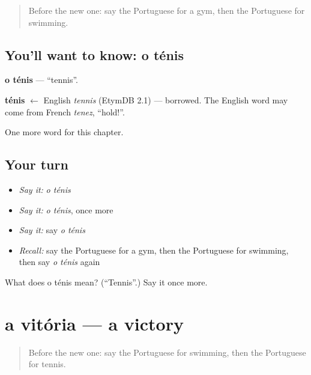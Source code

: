 \label{lesson:PT-C226-tenis}



\begin{quote}
Before the new one: say the Portuguese for a gym, then the Portuguese for swimming.
\end{quote}

\subsection*{You'll want to know: o ténis}
\textbf{o ténis} — \textquotedblleft{}tennis\textquotedblright{}.

\begin{cousinweb}
\textbf{ténis} $\leftarrow$ English \emph{tennis} (EtymDB 2.1) — borrowed. The English word may come from French \emph{tenez}, \textquotedblleft{}hold!\textquotedblright{}.
\end{cousinweb}

\begin{grammarlens}[title={What you've built}]
One more word for this chapter.
\end{grammarlens}

\subsection*{Your turn}
\begin{itemize}
\raggedright
  \item \emph{Say it:} \emph{o ténis}
  \item \emph{Say it:} \emph{o ténis}, once more
  \item \emph{Say it:} say \emph{o ténis}
  \item \emph{Recall:} say the Portuguese for a gym, then the Portuguese for swimming, then say \emph{o ténis} again
\end{itemize}

\begin{tcolorbox}[breakable,colback=teal!4,colframe=teal!35!black,title={Before you move on}]
What does o ténis mean? (\textquotedblleft{}Tennis\textquotedblright{}.) Say it once more.
\end{tcolorbox}
\section[a vitória]{a vitória — a victory}

\label{lesson:PT-C226-vitoria}



\begin{quote}
Before the new one: say the Portuguese for swimming, then the Portuguese for tennis.
\end{quote}

